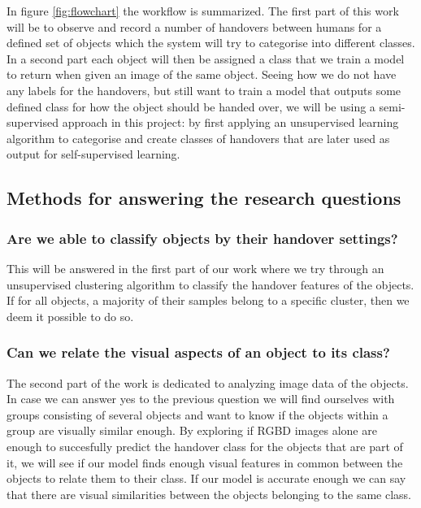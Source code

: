 In figure \ref{fig:flowchart} the workflow is summarized. The first part of this work will be to observe and record a number of handovers between humans for a defined set of objects which the system will try to categorise into different classes. In a second part each object will then be assigned a class that we train a model to return when given an image of the same object. Seeing how we do not have any labels for the handovers, but still want to train a model that outputs some defined class for how the object should be handed over, we will be using a semi-supervised approach in this project: by first applying an unsupervised learning algorithm to categorise and create classes of handovers that are later used as output for self-supervised learning.


\subsection*{Methods for answering the research questions}

\subsubsection*{Are we able to classify objects by their handover settings?}

This will be answered in the first part of our work where we try through an unsupervised clustering algorithm to classify the handover features of the objects. If for all objects, a majority of their samples belong to a specific cluster, then we deem it possible to do so.


\subsubsection*{Can we relate the visual aspects of an object to its class?}

The second part of the work is dedicated to analyzing image data of the objects. In case we can answer yes to the previous question we will find ourselves with groups consisting of several objects and want to know if the objects within a group are visually similar enough. By exploring if RGBD images alone are enough to succesfully predict the handover class for the objects that are part of it, we will see if our model finds enough visual features in common between the objects to relate them to their class. If our model is accurate enough we can say that there are visual similarities between the objects belonging to the same class.


